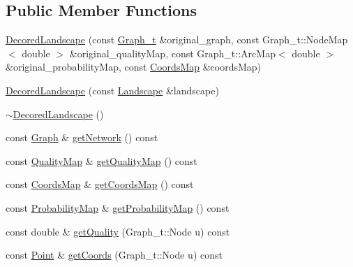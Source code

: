 \subsection*{Public Member Functions}
\begin{DoxyCompactItemize}
\item 
\hyperlink{class_decored_landscape_ae7ba2eb4a09b153b238f22fcb33b5260}{Decored\+Landscape} (const \hyperlink{pl__reff_8cpp_a65aea14f39d53b24df9910d54216d620}{Graph\+\_\+t} \&original\+\_\+graph, const Graph\+\_\+t\+::\+Node\+Map$<$ double $>$ \&original\+\_\+quality\+Map, const Graph\+\_\+t\+::\+Arc\+Map$<$ double $>$ \&original\+\_\+probability\+Map, const \hyperlink{classconcepts_1_1_abstract_landscape_a8432d7dff7edc5a5cbc524592b411f8a}{Coords\+Map} \&coords\+Map)
\item 
\hyperlink{class_decored_landscape_a501bfb6656d735d8a564ea4c0aa6ccfd}{Decored\+Landscape} (const \hyperlink{class_landscape}{Landscape} \&landscape)
\item 
\hyperlink{class_decored_landscape_a5fcaa5685a1296f29b382fcde0f6ee0e}{$\sim$\+Decored\+Landscape} ()
\item 
const \hyperlink{classconcepts_1_1_abstract_landscape_ab1988ca4ff36329c45af21e76046903d}{Graph} \& \hyperlink{class_decored_landscape_ae0cf946d7f221b0b7cbf89a645806d74}{get\+Network} () const
\item 
const \hyperlink{classconcepts_1_1_abstract_landscape_aab540b896ac9b7a7a5783f2a78f304ad}{Quality\+Map} \& \hyperlink{class_decored_landscape_a0493646916af886d3d0404760c3d5e4e}{get\+Quality\+Map} () const
\item 
const \hyperlink{classconcepts_1_1_abstract_landscape_a8432d7dff7edc5a5cbc524592b411f8a}{Coords\+Map} \& \hyperlink{class_decored_landscape_a66994174c58cad04d5fa75cb24ef2772}{get\+Coords\+Map} () const
\item 
const \hyperlink{classconcepts_1_1_abstract_landscape_ae90ffb759facff21b29e646539352182}{Probability\+Map} \& \hyperlink{class_decored_landscape_afdc878affae92d7c671f1e0f87223ee0}{get\+Probability\+Map} () const
\item 
const double \& \hyperlink{class_decored_landscape_a5bfb2c9f5ef7e7c760d8804d0ffd9d9b}{get\+Quality} (Graph\+\_\+t\+::\+Node u) const
\item 
const \hyperlink{abstract__landscape_8hpp_a9c14bcba65b035519a9c98f1eb1babbe}{Point} \& \hyperlink{class_decored_landscape_a45685d1bf37d032f1793f885eaf4e80c}{get\+Coords} (Graph\+\_\+t\+::\+Node u) const
\item 

\end{DoxyCompactItemize}
